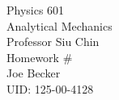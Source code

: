 \begin{titlepage}
\setlength{\topmargin}{1.5in}
\begin{center}
\Huge{Physics 601} \\
\LARGE{Analytical Mechanics} \\
\Large{Professor Siu Chin} \\[1cm]

\huge{Homework \#\HWnum}\\[0.5cm]

\large{Joe Becker} \\
\large{UID: 125-00-4128} \\
\large{\due} 

\end{center}

\end{titlepage}

